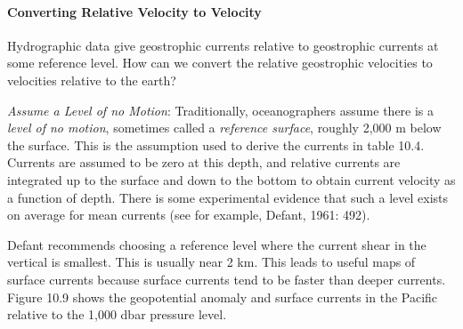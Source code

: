 \paragraph{Converting Relative Velocity to Velocity}
Hydrographic data
give geo\-stro\-phic currents relative to geostrophic
currents at some reference
level. How can we convert the relative geostrophic velocities to
velocities relative to the earth?

\begin{enumerate}
\vitem \textit{Assume a Level of no Motion}: Traditionally,
oceanographers assume there is a \textit{\textit{level of no motion}},
sometimes called a
\textit{\textit{reference surface}}, roughly 2,000 m below the
surface. This is the assumption used to derive the currents in table
10.4. Currents are assumed to be zero at this depth, and relative
currents are integrated up to the surface and down to the bottom to
obtain current velocity as a function of depth. There is some
experimental evidence that such a level exists on average for mean
currents (see for example, Defant, 1961: 492).

Defant recommends choosing a reference level where the current shear
in the vertical is smallest. This is usually near 2 km. This leads to
useful maps of surface currents because surface currents tend to be
faster than deeper currents. Figure 10.9 shows the geopotential
anomaly and surface currents in the Pacific relative to the 1,000 dbar
pressure level.


\end{enumerate}

